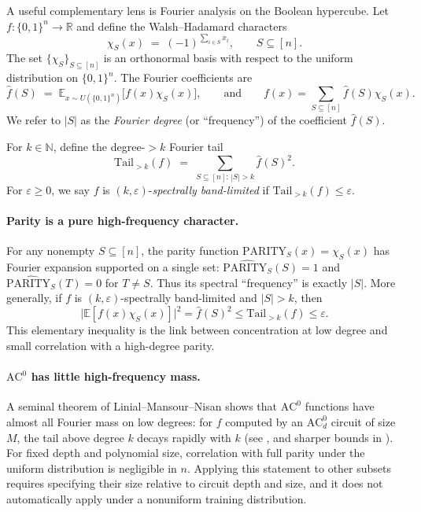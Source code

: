 \documentclass[twoside,11pt]{article}
\newcommand{\AC}{\mathrm{AC}}
\newcommand{\bits}{\{0,1\}}
\newcommand{\N}{\mathbb{N}}
\numberwithin{theorem}{section}
\numberwithin{equation}{section}
\begin{document}
A useful complementary lens is Fourier analysis on the Boolean hypercube.
Let $f:\bits^{n}\to\mathbb{R}$ and define the Walsh--Hadamard characters
\[
\chi_S(x) \;=\; (-1)^{\sum_{i\in S} x_i}, \qquad S\subseteq[n].
\]
The set $\{\chi_S\}_{S\subseteq[n]}$ is an orthonormal basis with respect to the uniform distribution on $\bits^n$.
The Fourier coefficients are
\[
\hat f(S)\;=\;\mathbb{E}_{x\sim U(\bits^n)}\bigl[f(x)\chi_S(x)\bigr],
\qquad\text{and}\qquad
f(x)=\sum_{S\subseteq[n]}\hat f(S)\chi_S(x).
\]
We refer to $|S|$ as the \emph{Fourier degree} (or ``frequency'') of the coefficient $\hat f(S)$.

\begin{definition}
\label{def:fourier-tail}
For $k\in\N$, define the degree-$>k$ Fourier tail
\[
\mathrm{Tail}_{>k}(f)\;=\;\sum_{S\subseteq[n]:\,|S|>k}\hat f(S)^2.
\]
For $\varepsilon\ge0$, we say $f$ is $(k,\varepsilon)$-\emph{spectrally band-limited} if $\mathrm{Tail}_{>k}(f)\le \varepsilon$.
\end{definition}

\paragraph{Parity is a pure high-frequency character.}
For any nonempty $S\subseteq[n]$, the parity function $\mathrm{PARITY}_S(x)=\chi_S(x)$ has Fourier expansion supported on a single set:
$\widehat{\mathrm{PARITY}_S}(S)=1$ and $\widehat{\mathrm{PARITY}_S}(T)=0$ for $T\neq S$.
Thus its spectral ``frequency'' is exactly $|S|$. More generally, if $f$ is $(k,\varepsilon)$-spectrally band-limited and $|S|>k$, then
\begin{equation}
\bigl|\mathbb{E}[f(x)\chi_S(x)]\bigr|^2=\hat f(S)^2\le\mathrm{Tail}_{>k}(f)\le\varepsilon.
\label{eq:tail-correlation}
\end{equation}
This elementary inequality is the link between concentration at low degree and small correlation with a high-degree parity.

\paragraph{$\AC^0$ has little high-frequency mass.}
A seminal theorem of Linial--Mansour--Nisan shows that $\AC^0$ functions have almost all Fourier mass on low degrees:
for $f$ computed by an $\AC^0_d$ circuit of size $M$, the tail above degree $k$ decays rapidly with $k$ (see \citep{linial1993constant}, and sharper bounds in \citep{tal2015tight}).
For fixed depth and polynomial size, correlation with full parity under the uniform distribution is negligible in $n$. Applying this statement to other subsets requires specifying their size relative to circuit depth and size, and it does not automatically apply under a nonuniform training distribution.
\end{document}
